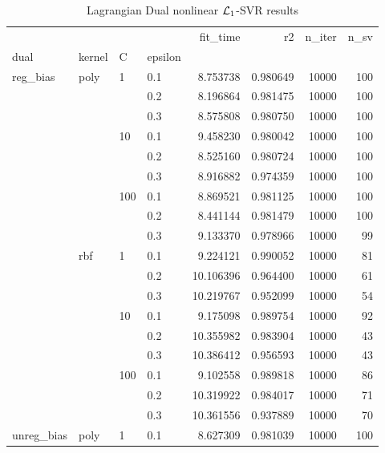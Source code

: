 \begin{table}[H]
\centering
\caption{Lagrangian Dual nonlinear $\protect \mathcal{L}_1$-SVR results}
\label{nonlinear_lagrangian_dual_l1_svr_cv_results}
\begin{tabular}{llllrrrr}
\toprule
           &     &     &     &   fit\_time &        r2 &  n\_iter &  n\_sv \\
dual & kernel & C & epsilon &            &           &         &       \\
\midrule
reg\_bias & poly & 1   & 0.1 &   8.753738 &  0.980649 &   10000 &   100 \\
           &     &     & 0.2 &   8.196864 &  0.981475 &   10000 &   100 \\
           &     &     & 0.3 &   8.575808 &  0.980750 &   10000 &   100 \\
           &     & 10  & 0.1 &   9.458230 &  0.980042 &   10000 &   100 \\
           &     &     & 0.2 &   8.525160 &  0.980724 &   10000 &   100 \\
           &     &     & 0.3 &   8.916882 &  0.974359 &   10000 &   100 \\
           &     & 100 & 0.1 &   8.869521 &  0.981125 &   10000 &   100 \\
           &     &     & 0.2 &   8.441144 &  0.981479 &   10000 &   100 \\
           &     &     & 0.3 &   9.133370 &  0.978966 &   10000 &    99 \\
           & rbf & 1   & 0.1 &   9.224121 &  0.990052 &   10000 &    81 \\
           &     &     & 0.2 &  10.106396 &  0.964400 &   10000 &    61 \\
           &     &     & 0.3 &  10.219767 &  0.952099 &   10000 &    54 \\
           &     & 10  & 0.1 &   9.175098 &  0.989754 &   10000 &    92 \\
           &     &     & 0.2 &  10.355982 &  0.983904 &   10000 &    43 \\
           &     &     & 0.3 &  10.386412 &  0.956593 &   10000 &    43 \\
           &     & 100 & 0.1 &   9.102558 &  0.989818 &   10000 &    86 \\
           &     &     & 0.2 &  10.319922 &  0.984017 &   10000 &    71 \\
           &     &     & 0.3 &  10.361556 &  0.937889 &   10000 &    70 \\
unreg\_bias & poly & 1   & 0.1 &   8.627309 &  0.981039 &   10000 &   100 \\

\end{tabular}
\end{table}
